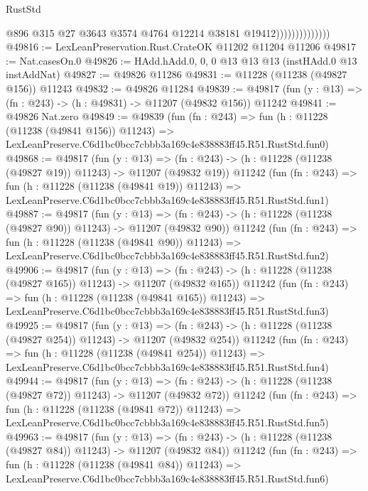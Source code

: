 \begin{lexlean}{RustStd}
\begin{coremodule}
                                @896
                                @315
                                @27
                                @3643
                                @3574
                                @4764
                                @12214
                                @38181
                                @19412))))))))))))))
@49816 := LexLeanPreservation.Rust.CrateOK @11202 @11204 @11206
@49817 := Nat.casesOn.{0}
@49826 := HAdd.hAdd.{0, 0, 0} @13 @13 @13 (instHAdd.{0} @13 instAddNat)
@49827 := @49826 @11286
@49831 := @11228 (@11238 (@49827 @156)) @11243
@49832 := @49826 @11284
@49839 := @49817 (fun (y : @13) => (fn : @243) -> (h : @49831) -> @11207 (@49832 @156)) @11242
@49841 := @49826 Nat.zero
@49849 := @49839
    (fun (fn : @243) =>
    fun (h : @11228 (@11238 (@49841 @156)) @11243) =>
    LexLeanPreserve.C6d1bc0bcc7cbbb3a169c4e838883ff45.R51.RustStd.fun0)
@49868 := @49817
    (fun (y : @13) =>
    (fn : @243) -> (h : @11228 (@11238 (@49827 @19)) @11243) -> @11207 (@49832 @19))
    @11242
    (fun (fn : @243) =>
    fun (h : @11228 (@11238 (@49841 @19)) @11243) =>
    LexLeanPreserve.C6d1bc0bcc7cbbb3a169c4e838883ff45.R51.RustStd.fun1)
@49887 := @49817
    (fun (y : @13) =>
    (fn : @243) -> (h : @11228 (@11238 (@49827 @90)) @11243) -> @11207 (@49832 @90))
    @11242
    (fun (fn : @243) =>
    fun (h : @11228 (@11238 (@49841 @90)) @11243) =>
    LexLeanPreserve.C6d1bc0bcc7cbbb3a169c4e838883ff45.R51.RustStd.fun2)
@49906 := @49817
    (fun (y : @13) =>
    (fn : @243) -> (h : @11228 (@11238 (@49827 @165)) @11243) -> @11207 (@49832 @165))
    @11242
    (fun (fn : @243) =>
    fun (h : @11228 (@11238 (@49841 @165)) @11243) =>
    LexLeanPreserve.C6d1bc0bcc7cbbb3a169c4e838883ff45.R51.RustStd.fun3)
@49925 := @49817
    (fun (y : @13) =>
    (fn : @243) -> (h : @11228 (@11238 (@49827 @254)) @11243) -> @11207 (@49832 @254))
    @11242
    (fun (fn : @243) =>
    fun (h : @11228 (@11238 (@49841 @254)) @11243) =>
    LexLeanPreserve.C6d1bc0bcc7cbbb3a169c4e838883ff45.R51.RustStd.fun4)
@49944 := @49817
    (fun (y : @13) =>
    (fn : @243) -> (h : @11228 (@11238 (@49827 @72)) @11243) -> @11207 (@49832 @72))
    @11242
    (fun (fn : @243) =>
    fun (h : @11228 (@11238 (@49841 @72)) @11243) =>
    LexLeanPreserve.C6d1bc0bcc7cbbb3a169c4e838883ff45.R51.RustStd.fun5)
@49963 := @49817
    (fun (y : @13) =>
    (fn : @243) -> (h : @11228 (@11238 (@49827 @84)) @11243) -> @11207 (@49832 @84))
    @11242
    (fun (fn : @243) =>
    fun (h : @11228 (@11238 (@49841 @84)) @11243) =>
    LexLeanPreserve.C6d1bc0bcc7cbbb3a169c4e838883ff45.R51.RustStd.fun6)

\end{coremodule}
\end{lexlean}
